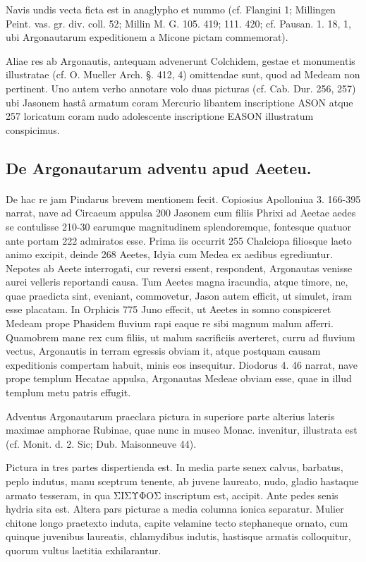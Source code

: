 \documentclass[landscape, a4paper, 11pt, oneside, polutonikogreek, german]{article}
\begin{document}
Navis undis vecta ficta est in anaglypho et nummo (cf. Flangini 1; Millingen Peint. vas. gr. div. coll. 52; Millin M. G. 105. 419; 111. 420; cf. Pausan. 1. 18, 1, ubi Argonautarum expeditionem a Micone pictam commemorat).

Aliae res ab Argonautis, antequam advenerunt Colchidem, gestae et monumentis illustratae (cf. O. Mueller Arch. §. 412, 4) omittendae sunt, quod ad Medeam non pertinent. Uno autem verho annotare volo duas picturas (cf. Cab. Dur. 256, 257) ubi Jasonem hastâ armatum coram Mercurio libantem inscriptione ASON atque 257 loricatum coram nudo adolescente inscriptione EASON illustratum conspicimus.

\subsection{De Argonautarum adventu apud Aeeteu.}
\paragraph{}
De hac re jam Pindarus brevem mentionem fecit. Copiosius Apolloniua 3. 166-395 narrat, nave ad Circaeum appulsa 200 Jasonem cum filiis Phrixi ad Aeetae aedes se contulisse 210-30 earumque magnitudinem splendoremque, fontesque quatuor ante portam 222 admiratos esse. Prima iis occurrit 255 Chalciopa filiosque laeto animo excipit, deinde 268 Aeetes, Idyia cum Medea ex aedibus egrediuntur. Nepotes ab Aeete interrogati, cur reversi essent, respondent, Argonautas venisse aurei velleris reportandi causa. Tum Aeetes magna iracundia, atque timore, ne, quae praedicta sint, eveniant, commovetur, Jason autem efficit, ut simulet, iram esse placatam. In Orphicis 775 Juno effecit, ut Aeetes in somno conspiceret Medeam prope Phasidem fluvium rapi eaque re sibi magnum malum afferri. Quamobrem mane rex cum filiis, ut malum sacrificiis averteret, curru ad fluvium vectus, Argonautis in terram egressis obviam it, atque postquam causam expeditionis compertam habuit, minis eos insequitur. Diodorus 4. 46 narrat, nave prope templum Hecatae appulsa, Argonautas Medeae obviam esse, quae in illud templum metu patris effugit.

Adventus Argonautarum praeclara pictura in superiore parte alterius lateris maximae amphorae Rubinae, quae nunc in museo Monac. invenitur, illustrata est (cf. Monit. d. 2. Sic; Dub. Maisonneuve 44).

Pictura in tres partes dispertienda est. In media parte senex calvus, barbatus, peplo indutus, manu sceptrum tenente, ab juvene laureato, nudo, gladio hastaque armato tesseram, in qua ΣΙΣΥΦΟΣ inscriptum est, accipit. Ante pedes senis hydria sita est. Altera pars picturae a media columna ionica separatur. Mulier chitone longo praetexto induta, capite velamine tecto stephaneque ornato, cum quinque juvenibus laureatis, chlamydibus indutis, hastisque armatis colloquitur, quorum vultus laetitia exhilarantur.
\end{document}
